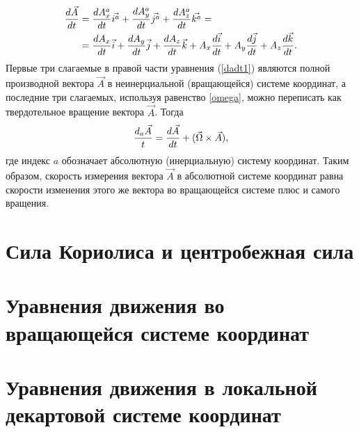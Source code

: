     \begin{equation}
    \begin{aligned}
    \label{dadt1}
        \displaystyle\frac{d \vec{A}}{d t} &=\displaystyle\frac{d A_x^a}{d t}\vec{i^a} + \displaystyle\frac{d A_y^a}{d t}\vec{j^a} + \displaystyle\frac{d A_z^a}{d t}\vec{k^a} = \\ 
        &= 
            \displaystyle\frac{d A_x}{d t}\vec{i} 
            + \displaystyle\frac{d A_y}{d t}\vec{j} 
            + \displaystyle\frac{d A_z}{d t}\vec{k}
            + A_x\displaystyle\frac{d \vec{i}}{d t}  
            + A_y\displaystyle\frac{d \vec{j}}{d t}  
            + A_z\displaystyle\frac{d \vec{k}}{d t}. 
    \end{aligned}
    \end{equation}
    Первые три слагаемые в правой части уравнения (\ref{dadt1}) являются полной производной вектора $\vec{A}$ в неинерциальной (вращающейся) системе координат, а последние три слагаемых, используя равенство \ref{omega}, можно переписать как твердотельное вращение вектора $\vec{A}$. Тогда 
    \begin{equation}
    \label{dadt2}
        \frac{d_a\vec{A}}{t} = \displaystyle\frac{d \vec{A}}{d t} + (\vec{\Omega}\times\vec{A}),
    \end{equation}
    где индекс $a$ обозначает абсолютную (инерциальную) систему координат. Таким образом, скорость измерения вектора $\vec{A}$ в абсолютной системе координат равна скорости изменения этого же вектора во вращающейся системе плюс и самого вращения. 

\section{{\color{noone} Сила Кориолиса и центробежная сила}}


    

\section{{\color{noone} Уравнения движения во вращающейся системе координат}}
    


\section{{\color{noone} Уравнения движения в локальной декартовой системе координат}}

